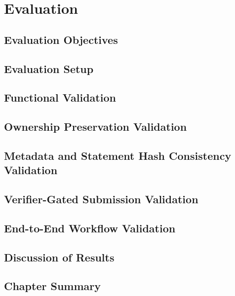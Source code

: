 \chapter{Evaluation}
\section{Evaluation Objectives}
\section{Evaluation Setup}
\section{Functional Validation}
\section{Ownership Preservation Validation}
\section{Metadata and Statement Hash Consistency Validation}
\section{Verifier-Gated Submission Validation}
\section{End-to-End Workflow Validation}
\section{Discussion of Results}
\section{Chapter Summary}
